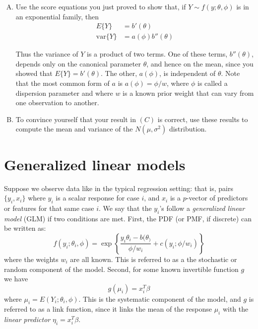 \documentclass{mynotes}
\begin{document}
\begin{enumerate}[(A)]
\item Use the score equations you just proved to show that, if $Y \sim f(y; \theta, \phi)$ is in an exponential family, then
$$
\begin{aligned}
E\{ Y \} &=  b'(\theta) \\
\mbox{var} \{ Y \} &= a(\phi) b''(\theta) 
\end{aligned}
$$

Thus the variance of $Y$ is a product of two terms.  One of these terms, $b''(\theta)$, depends only on the canonical parameter $\theta$, and hence on the mean, since you showed that $E\{ Y \} =  b'(\theta)$.  The other, $a(\phi)$, is independent of $\theta$.  Note that the most common form of $a$ is $a(\phi) = \phi/w$, where $\phi$ is called a dispersion parameter and where $w$ is a known prior weight that can vary from one observation to another.  

\item To convince yourself that your result in $(C)$ is correct, use these results to compute the mean and variance of the $N(\mu, \sigma^2)$ distribution.  

\end{enumerate}


\section{Generalized linear models}  

Suppose we observe data like in the typical regression setting: that is, pairs $\{y_i, x_i\}$ where $y_i$ is a scalar response for case $i$, and $x_i$ is a $p$-vector of predictors or features for that same case $i$.  We say that the $y_i$'s follow a \textit{generalized linear model} (GLM) if two conditions are met.  First, the PDF (or PMF, if discrete) can be written as:  
$$
f(y_i; \theta_i,  \phi)  = \exp \left\{ \frac{y_i \theta_i - b(\theta_)}{\phi/w_i} + c(y_i; \phi/w_i)   \right \}
$$
where the weights $w_i$ are all known.  This is referred to as a the stochastic or random component of the model.  Second, for some known invertible function $g$ we have
$$
g(\mu_i) = x_i^T \beta
$$
where $\mu_i = E(Y_i; \theta_i, \phi)$.  This is the systematic component of the model, and $g$ is referred to as a link function, since it links the mean of the response $\mu_i$ with the \emph{linear predictor} $\eta_i = x_i^T \beta$.  
\end{document}
